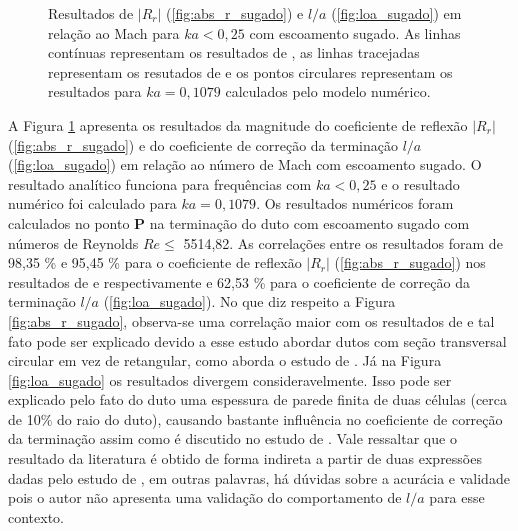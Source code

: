 \begin{figure}[ht!]
\begin{subfigure}{\scaleA \textwidth}
  
\end{subfigure}%
\begin{subfigure}{\scaleA \textwidth}
  
\end{subfigure}
\caption[Resultados de $|R_{r}|$ e $l/a$ em relação ao número de Mach para baixas frequências com escoamento sugado]{Resultados de $|R_{r}|$ (\ref{fig:abs_r_sugado}) e $l/a$ (\ref{fig:loa_sugado}) em relação ao Mach para $ka < 0,25$ com escoamento sugado. As linhas contínuas representam os resultados de , as linhas tracejadas representam os resutados de  e os pontos circulares representam os resultados para $ka = 0,1079$ calculados pelo modelo numérico.}
\label{fig:resultados_sugado}
\end{figure}

A Figura \ref{fig:resultados_sugado} apresenta os resultados da magnitude do coeficiente de reflexão $|R_{r}|$ (\ref{fig:abs_r_sugado}) e do coeficiente de correção da terminação $l/a$ (\ref{fig:loa_sugado}) em relação ao número de Mach com escoamento sugado. O resultado analítico funciona para frequências com $ka < 0,25$ e o resultado numérico foi calculado para $ka = 0,1079$. Os resultados numéricos foram calculados no ponto $\textbf{P}$ na terminação do duto com escoamento sugado com números de Reynolds $Re \leq$ 5514,82. As correlações entre os resultados foram de 98,35 \% e 95,45 \% para o coeficiente de reflexão $|R_{r}|$ (\ref{fig:abs_r_sugado}) nos resultados de  e  respectivamente e 62,53 \% para o coeficiente de correção da terminação $l/a$ (\ref{fig:loa_sugado}). No que diz respeito a Figura \ref{fig:abs_r_sugado}, observa-se uma correlação maior com os resultados de  e tal fato pode ser explicado devido a esse estudo abordar dutos com seção transversal circular em vez de retangular, como aborda o estudo de . Já na Figura \ref{fig:loa_sugado} os resultados divergem consideravelmente. Isso pode ser explicado pelo fato do duto uma espessura de parede finita de duas células (cerca de 10\% do raio do duto), causando bastante influência no coeficiente de correção da terminação assim como é discutido no estudo de . Vale ressaltar que o resultado da literatura é obtido de forma indireta a partir de duas expressões dadas pelo estudo de , em outras palavras, há dúvidas sobre a acurácia e validade pois o autor não apresenta uma validação do comportamento de $l/a$ para esse contexto.

